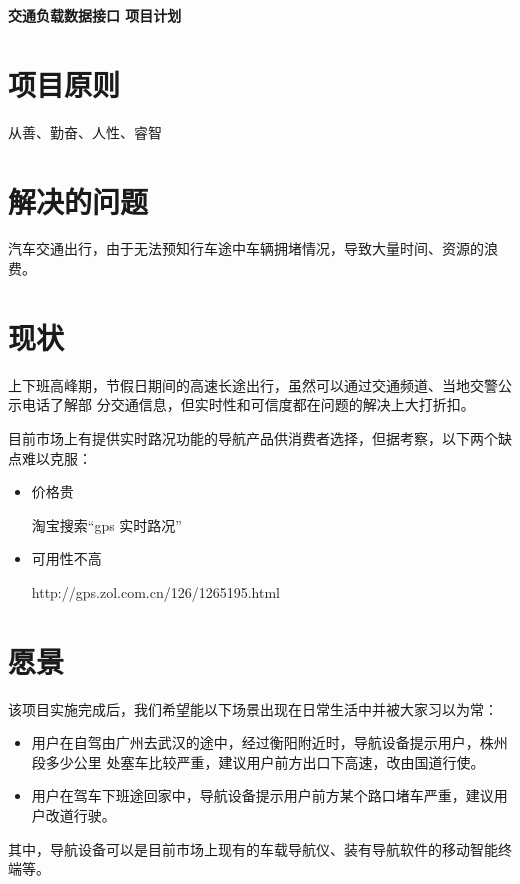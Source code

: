 \documentclass{article}
\begin{document}
  \begin{center}
    \huge \bf  交通负载数据接口 项目计划
  \end{center}

  \section{项目原则}
  从善、勤奋、人性、睿智



  \section{解决的问题}
  汽车交通出行，由于无法预知行车途中车辆拥堵情况，导致大量时间、资源的浪费。



  \section{现状}
  上下班高峰期，节假日期间的高速长途出行，虽然可以通过交通频道、当地交警公示电话了解部
  分交通信息，但实时性和可信度都在问题的解决上大打折扣。
  
  目前市场上有提供实时路况功能的导航产品供消费者选择，但据考察，以下两个缺点难以克服：
  
  \begin{itemize}
  \item 价格贵

    淘宝搜索“gps 实时路况”
  \item 可用性不高

    http://gps.zol.com.cn/126/1265195.html
  \end{itemize}
  


  \section{愿景}
  该项目实施完成后，我们希望能以下场景出现在日常生活中并被大家习以为常：
  \begin{itemize}
  \item 用户在自驾由广州去武汉的途中，经过衡阳附近时，导航设备提示用户，株州段多少公里
    处塞车比较严重，建议用户前方出口下高速，改由国道行使。
  \item 用户在驾车下班途回家中，导航设备提示用户前方某个路口堵车严重，建议用户改道行驶。
  \end{itemize}
  其中，导航设备可以是目前市场上现有的车载导航仪、装有导航软件的移动智能终端等。
\end{document}

